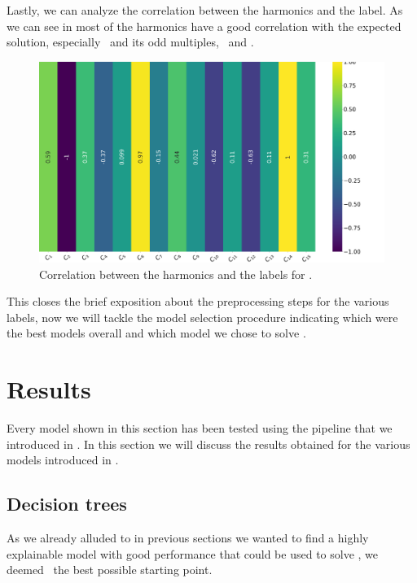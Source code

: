 Lastly, we can analyze the correlation between the harmonics and the label. As we can see in
 most of the harmonics have a good correlation with the expected solution,
especially \phin[2]\ and its odd multiples, \phin[1]\ and \phin[12].
\begin{figure}[!ht]
	\centering
	\includegraphics[width=\linewidth]{img/Phi_label_corr.png}
	\caption{Correlation between the harmonics and the labels for \phin.} \label{fig:phi-lcorr}
\end{figure}

\medskip

This closes the brief exposition about the preprocessing steps for the various labels, now we will
tackle the model selection procedure indicating which were the best models overall and which model
we chose to solve \qrp.

\section{Results}
\label{sec:results-qrp}
Every model shown in this section has been tested using the pipeline that we introduced in
. In this section we will discuss the results obtained for the various models
introduced in .

\subsection{Decision trees}
\label{sec:qrp-dt}
As we already alluded to in previous sections we wanted to find a highly explainable model with good
performance that could be used to solve \qrp, we deemed \dts\ the best possible starting point.

